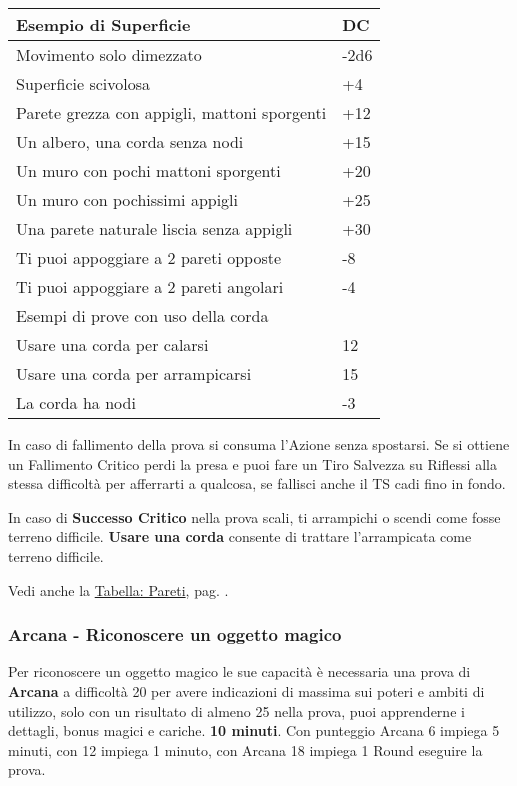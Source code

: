 \begin{multicols}{2}
\noindent\begin{tabularx}{\linewidth}{Xl}
	\toprule
	\textbf{Esempio di Superficie} & \textbf{DC}\\
	\toprule
	Movimento solo dimezzato & -2d6\\
	Superficie scivolosa&+4\\
	{\small Parete grezza con appigli, mattoni sporgenti}&+12\\
	Un albero, una corda senza nodi&+15\\
	Un muro con pochi mattoni sporgenti &+20\\
	Un muro con pochissimi appigli&+25\\
	Una parete naturale liscia senza appigli&+30\\
	Ti puoi appoggiare a 2 pareti opposte&-8\\
	Ti puoi appoggiare a 2 pareti angolari&-4\\
	\midrule
	Esempi di prove con uso della corda&\\
	\midrule
	Usare una corda per calarsi&12\\
	Usare una corda per arrampicarsi&15\\
	La corda ha nodi & -3
\end{tabularx}

\medskip

In caso di fallimento della prova si consuma l'Azione senza spostarsi. Se si ottiene un Fallimento Critico perdi la presa e puoi fare un Tiro Salvezza su Riflessi alla stessa difficoltà per afferrarti a qualcosa, se fallisci anche il TS cadi fino in fondo.

In caso di \textbf{Successo Critico} nella prova scali, ti arrampichi o scendi come fosse terreno difficile. \textbf{Usare una corda} consente di trattare l'arrampicata come terreno difficile.

Vedi anche la \hyperlink{pareti}{Tabella: Pareti}, pag. \pageref{pareti}.

\titlespacing*{\subsubsection}{0pt}{0.5em}{0.5em}\subsubsection*{Arcana - Riconoscere un oggetto magico} \label{rinoscereoggettomagico}\hypertarget{rinoscereoggettomagico}{}

Per riconoscere un oggetto magico le sue capacità è necessaria una prova di \textbf{Arcana} a difficoltà 20 per avere indicazioni di massima sui poteri e ambiti di utilizzo, solo con un risultato di almeno 25 nella prova, puoi apprenderne i dettagli, bonus magici e cariche. \textbf{10 minuti}. Con punteggio Arcana 6 impiega 5 minuti, con 12 impiega 1 minuto, con Arcana 18 impiega 1 Round eseguire la prova.


\end{multicols}

